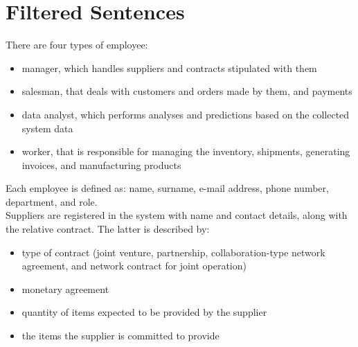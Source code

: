 \section{Filtered Sentences}
There are four types of employee:
\begin{itemize}
	\item manager, which handles suppliers and contracts stipulated with them
	\item salesman, that deals with customers and orders made by them, and payments
	\item data analyst, which performs analyses and predictions based on the collected system data
	\item worker, that is responsible for managing the inventory, shipments, generating invoices, and manufacturing products
\end{itemize}
Each employee is defined as: name, surname, e-mail address, phone number, department, and role.\\
Suppliers are registered in the system with name and contact details, along with the relative contract. The latter is described by:
\begin{itemize}
	\item type of contract (joint venture, partnership, collaboration-type network agreement, and network contract for joint operation)
	\item monetary agreement
	\item quantity of items expected to be provided by the supplier
	\item the items the supplier is committed to provide
\end{itemize}